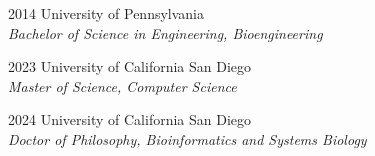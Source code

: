 \documentclass[11pt]{formatting-template}
\begin{document}
\begin{vita}
\noindent
\begin{cv}{}
\begin{cvlist}{}
	\item[2014] University of Pennsylvania\\
		\textit{Bachelor of Science in Engineering, Bioengineering}
	\item[2023] University of California San Diego\\
		\textit{Master of Science, Computer Science}
	\item[2024] University of California San Diego\\
		\textit{Doctor of Philosophy, Bioinformatics and Systems Biology}
\end{cvlist}
\end{cv}



\end{vita}

\begin{dissertationabstract}
\end{dissertationabstract}

\mainmatter{}







\appendix





\backmatter{}
 

\end{document}
